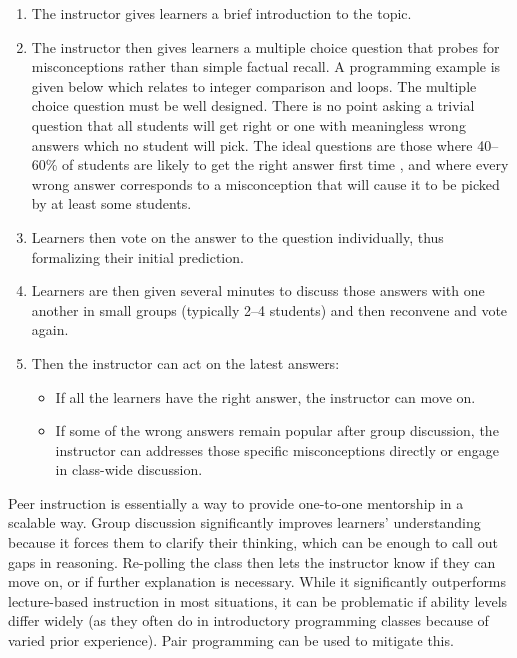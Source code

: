 \begin{enumerate}

\item
  The instructor gives learners a brief introduction to the topic.

\item
  The instructor then gives learners a multiple choice question that
  probes for misconceptions rather than simple factual recall.  A
  programming example is given below which relates to integer
  comparison and loops.  The multiple choice question must be well
  designed.  There is no point asking a trivial question that all
  students will get right or one with meaningless wrong answers which
  no student will pick.  The ideal questions are those where 40--60\%
  of students are likely to get the right answer first time
  \cite[p23]{NRC2015}, and where every wrong answer corresponds to a
  misconception that will cause it to be picked by at least some
  students.

\item
  Learners then vote on the answer to the question individually, thus
  formalizing their initial prediction.

\item
  Learners are then given several minutes to discuss those answers
  with one another in small groups (typically 2--4 students) and then
  reconvene and vote again.

\item
  Then the instructor can act on the latest answers:

  \begin{itemize}
  \item
    If all the learners have the right answer, the instructor can move on.
  \item
    If some of the wrong answers remain popular after group
    discussion, the instructor can addresses those specific
    misconceptions directly or engage in class-wide discussion.
  \end{itemize}

\end{enumerate}

Peer instruction is essentially a way to provide one-to-one mentorship
in a scalable way.  Group discussion significantly improves learners'
understanding because it forces them to clarify their thinking, which
can be enough to call out gaps in reasoning.  Re-polling the class
then lets the instructor know if they can move on, or if further
explanation is necessary.  While it significantly outperforms
lecture-based instruction in most situations, it can be problematic if
ability levels differ widely (as they often do in introductory
programming classes because of varied prior experience).  Pair
programming can be used to mitigate this.

